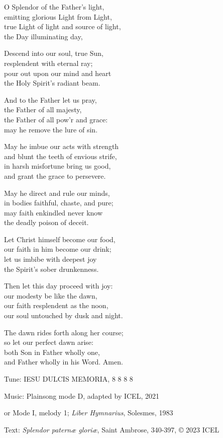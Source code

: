 \hymn

\begin{hymnverse}
O Splendor of the Father’s light,\\
emitting glorious Light from Light,\\
true Light of light and source of light,\\
the Day illuminating day,

Descend into our soul, true Sun,\\
resplendent with eternal ray;\\
pour out upon our mind and heart\\
the Holy Spirit’s radiant beam.

And to the Father let us pray,\\
the Father of all majesty,\\
the Father of all pow’r and grace:\\
may he remove the lure of sin.

May he imbue our acts with strength\\
and blunt the teeth of envious strife,\\
in harsh misfortune bring us good,\\
and grant the grace to persevere.

May he direct and rule our minds,\\
in bodies faithful, chaste, and pure;\\
may faith enkindled never know\\
the deadly poison of deceit.

Let Christ himself become our food,\\
our faith in him become our drink;\\
let us imbibe with deepest joy\\
the Spirit’s sober drunkenness.

Then let this day proceed with joy:\\
our modesty be like the dawn,\\
our faith resplendent as the noon,\\
our soul untouched by dusk and night.

The dawn rides forth along her course;\\
so let our perfect dawn arise:\\
both Son in Father wholly one,\\
and Father wholly in his Word. Amen.
\end{hymnverse}

\begin{hymnsource}
Tune: IESU DULCIS MEMORIA, 8 8 8 8

Music: Plainsong mode D, adapted by ICEL, 2021

or Mode I, melody 1; \emph{Liber Hymnarius}, Solesmes, 1983

Text: \emph{Splendor paternæ gloriæ}, Saint Ambrose, 340-397, © 2023 ICEL
\end{hymnsource}